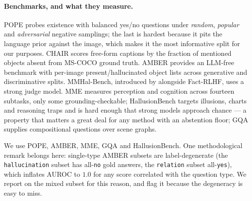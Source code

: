 \documentclass{article}
\theoremstyle{plain}
\theoremstyle{definition}
\theoremstyle{remark}
\begin{document}
\paragraph{Benchmarks, and what they measure.}
POPE \citep{pope} probes existence with balanced yes/no questions under \emph{random},
\emph{popular} and \emph{adversarial} negative samplings; the last is hardest because it pits
the language prior against the image, which makes it the most informative split for our
purposes. CHAIR \citep{chair} scores free-form captions by the fraction of mentioned objects
absent from MS-COCO ground truth. AMBER \citep{amber} provides an LLM-free benchmark with
per-image present/hallucinated object lists across generative and discriminative splits.
MMHal-Bench, introduced by \citet{sun2024aligning} alongside Fact-RLHF, uses a strong judge
model. MME \citep{mme} measures perception and cognition across fourteen subtasks, only some
grounding-checkable; HallusionBench \citep{hallusionbench} targets illusions, charts and
reasoning traps and is hard enough that strong models approach chance --- a property that
matters a great deal for any method with an abstention floor; GQA \citep{gqa} supplies
compositional questions over scene graphs.

We use POPE, AMBER, MME, GQA and HallusionBench. One methodological remark belongs here:
single-type AMBER subsets are label-degenerate (the \texttt{hallucination} subset has
all-\texttt{no} gold answers, the \texttt{relation} subset all-\texttt{yes}), which inflates
AUROC to $1.0$ for any score correlated with the question type. We report on the mixed subset
for this reason, and flag it because the degeneracy is easy to miss.
\end{document}
